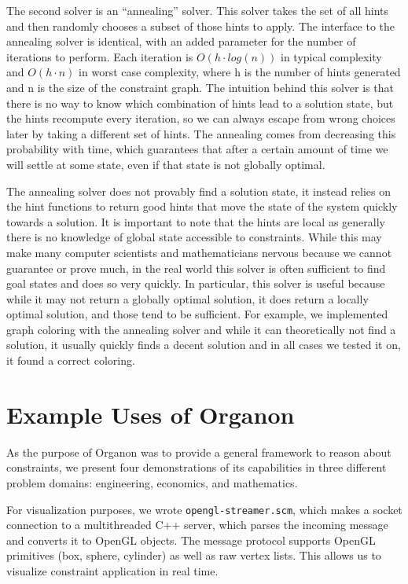 \documentclass[12pt,a4paper]{article}
\begin{document}
The second solver is an ``annealing'' solver. This solver takes the set of all hints and then randomly chooses a subset of those hints to apply. The interface to the annealing solver is identical, with an added parameter for the number of iterations to perform. Each iteration is $O(h \cdot log(n))$ in typical complexity and $O(h \cdot n)$ in worst case complexity, where h is the number of hints generated and n is the size of the constraint graph.   The intuition behind this solver is that there is no way to know which combination of hints lead to a solution state, but the hints recompute every iteration, so we can always escape from wrong choices later by taking a different set of hints.  The annealing comes from decreasing this probability with time, which guarantees that after a certain amount of time we will settle at some state, even if that state is not globally optimal.  

The annealing solver does not provably find a solution state, it instead relies on the hint functions to return good hints that move the state of the system quickly towards a solution.  It is important to note that the hints are local as generally there is no knowledge of global state accessible to constraints.  While this may make many computer scientists and mathematicians nervous because we cannot guarantee or prove much, in the real world this solver is often sufficient to find goal states and does so very quickly.  In particular, this solver is useful because while it may not return a globally optimal solution, it does return a locally optimal solution, and those tend to be sufficient.  For example, we implemented graph coloring with the annealing solver and while it can theoretically not find a solution, it usually quickly finds a decent solution and in all cases we tested it on, it found a correct coloring.
\newline
\section{Example Uses of Organon}

As the purpose of Organon was to provide a general framework to reason about constraints, we present four demonstrations of its capabilities in three different problem domains: engineering, economics, and mathematics.

For visualization purposes, we wrote \texttt{opengl-streamer.scm}, which makes a socket connection to a multithreaded C++ server, which parses the incoming message and converts it to OpenGL objects. The message protocol supports OpenGL primitives (box, sphere, cylinder) as well as raw vertex lists. This allows us to visualize constraint application in real time. 
\end{document}
